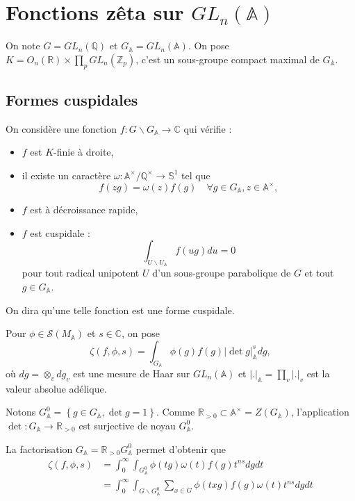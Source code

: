 \section{Fonctions zêta sur $GL_n(\mathbb{A})$}

On note $G = GL_n(\mathbb{Q})$ et $G_\mathbb{A}=GL_n(\mathbb{A})$. On pose $K = O_n(\mathbb{R}) \times \prod_p GL_n(\mathbb{Z}_p)$, c'est un sous-groupe compact maximal de $G_\mathbb{A}$.

\subsection{Formes cuspidales}
On considère une fonction $f : G \backslash G_\mathbb{A} \rightarrow \mathbb{C}$ qui vérifie :
\begin{itemize}
\item $f$ est $K$-finie à droite,
\item il existe un caractère $\omega : \mathbb{A}^\times/\mathbb{Q}^\times \rightarrow \mathbb{S}^1$ tel que
\begin{equation}
f(zg) = \omega(z)f(g) \quad \forall g \in G_\mathbb{A}, z \in \mathbb{A}^\times,
\end{equation}
\item $f$ est à décroissance rapide,
\item $f$ est cuspidale :
\begin{equation}
\int_{U \backslash U_\mathbb{A}} f(ug) du = 0
\end{equation}
pour tout radical unipotent $U$ d'un sous-groupe parabolique de $G$ et tout $g \in G_\mathbb{A}$.
\end{itemize}
On dira qu'une telle fonction est une forme cuspidale.

Pour $\phi \in \mathcal{S}(M_\mathbb{A})$ et $s \in \mathbb{C}$, on pose
\begin{equation}
\zeta(f, \phi, s) = \int_{G_\mathbb{A}} \phi(g) f(g) |\det g|_\mathbb{A}^s dg,
\end{equation}
où $dg = \otimes_v dg_v$ est une mesure de Haar sur $GL_n(\mathbb{A})$ et $|.|_\mathbb{A} = \prod_v |.|_v$ est la valeur absolue adélique.

Notons $G^0_\mathbb{A}=\left\lbrace g \in G_\mathbb{A}, \det g = 1 \right\rbrace$. Comme $\mathbb{R}_{> 0} \subset \mathbb{A}^\times=Z(G_\mathbb{A})$, l'application $\det : G_\mathbb{A} \rightarrow \mathbb{R}_{> 0}$ est surjective de noyau $G^0_\mathbb{A}$.

La factorisation $G_\mathbb{A} = \mathbb{R}_{> 0}G^0_\mathbb{A}$ permet d'obtenir que
\begin{align}
\zeta(f, \phi, s) &= \int_0^\infty \int_{G^0_\mathbb{A}} \phi(tg) \omega(t) f(g) t^{ns} dg dt \\
&= \int_0^\infty \int_{G \backslash G^0_\mathbb{A}} \sum_{x \in G}{\phi(txg)} f(g) \omega(t) t^{ns} dg dt
\end{align}

